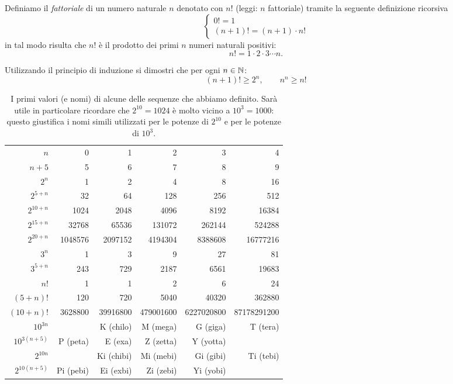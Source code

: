 Definiamo il 
\emph{fattoriale}%
%
%
%
di un numero naturale $n$
denotato con $n!$ (leggi: $n$ fattoriale) 
tramite la seguente definizione ricorsiva
\[
  \begin{cases}
    0! = 1 \\
    (n+1)! = (n+1) \cdot n!
  \end{cases}
\]
in tal modo risulta che $n!$ è il prodotto dei primi $n$ numeri naturali positivi:
\[
  n! = 1 \cdot 2 \cdot 3 \cdots n.  
\]

\begin{exercise}
  \label{ex:6734098}%
  Utilizzando il principio di induzione
  si dimostri che per ogni $n\in {\mathbb N}$:
  \[
    (n+1)! \ge 2^n, \qquad
    n^n \ge n!
  \]
\end{exercise}

\begin{table}
  \begin{center}
  \begin{tabular}{r|>{\small}r>{\small}r>{\small}r>{\small}r>{\small}r}
  $n$       & 0 & 1 & 2 & 3 & 4 \\
  \footnotesize $n+5$     & 5 & 6 & 7 & 8 & 9 \\ \hline
  $2^n$     & 1 & 2 & 4 & 8 & 16 \\
  \footnotesize $2^{5+n}$ & 32 & 64 & 128 & 256 & 512 \\
  \footnotesize $2^{10+n}$ & 1024 & 2048 & 4096 & 8192 & 16384 \\
  \footnotesize $2^{15+n}$ & 32768 & 65536 & 131072 & 262144 & 524288 \\
  \footnotesize $2^{20+n}$ & 1048576 & 2097152 & 4194304 & 8388608 & 16777216 \\  \hline
  $3^n$                    & 1 & 3 & 9 & 27 & 81 \\
  \footnotesize $3^{5+n}$  & 243 & 729 & 2187 & 6561 & 19683 \\  \hline
  $n!$      & 1 & 1 & 2 & 6 & 24 \\
  \footnotesize $(5+n)!$  & 120 & 720 & 5040 & 40320 & 362880 \\
  \footnotesize $(10+n)!$  & 3628800 & 39916800 & 479001600 & 6227020800 & 87178291200 \\ \hline
  \footnotesize $10^{3n}$  &  & K (chilo) & M (mega) & G (giga) & T (tera) \\ 
  \footnotesize $10^{3(n+5)}$  & P (peta) & E (exa) & Z (zetta) & Y (yotta) \\ \hline
  \footnotesize $2^{10n}$  &  & Ki (chibi) & Mi (mebi) & Gi (gibi) & Ti (tebi) \\
  \footnotesize $2^{10(n+5)}$ & Pi (pebi)& Ei (exbi) & Zi (zebi) & Yi (yobi)
  \end{tabular}
  \end{center}
  \caption{I primi valori (e nomi) di alcune delle sequenze che abbiamo definito.
  Sarà utile in particolare ricordare che  $2^{10}=1024$ 
  è molto vicino a $10^3=1000$: questo giustifica i nomi simili utilizzati
  per le potenze di $2^{10}$ e per le potenze di $10^3$.
  }
  \end{table}
  
